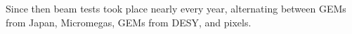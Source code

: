 Since then beam tests took place nearly every year, alternating between GEMs from Japan, Micromegas, GEMs from DESY, and pixels.








